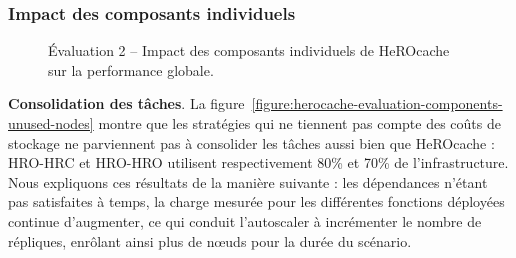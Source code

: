 {\subsubsection{Impact des composants individuels}

\begin{figure}[!ht]
    \center
    \qquad
    \qquad
    \caption{Évaluation 2 -- Impact des composants individuels de HeROcache sur la performance globale.}
    \label{figure:herocache-evaluation-components}
\end{figure}

\textbf{Consolidation des tâches}. La figure~\ref{figure:herocache-evaluation-components-unused-nodes} montre que les stratégies qui ne tiennent pas compte des coûts de stockage ne parviennent pas à consolider les tâches aussi bien que HeROcache : HRO-HRC et HRO-HRO utilisent respectivement 80\% et 70\% de l'infrastructure. Nous expliquons ces résultats de la manière suivante : les dépendances n'étant pas satisfaites à temps, la charge mesurée pour les différentes fonctions déployées continue d'augmenter, ce qui conduit l'autoscaler à incrémenter le nombre de répliques, enrôlant ainsi plus de nœuds pour la durée du scénario.

}
